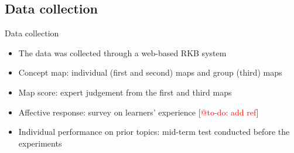 \subsection{Data collection}

\begin{frame}{Data collection}
\begin{itemize}
    \item The data was collected through a web-based RKB system
    \item Concept map: individual (first and second) maps and group (third) maps
    \item Map score: expert judgement from the first and third maps
    \item Affective response: survey on learners' experience [\textcolor{red}{@to-do: add ref}]
    \item Individual performance on prior topics: mid-term test conducted before the experiments
\end{itemize}
    
\end{frame}